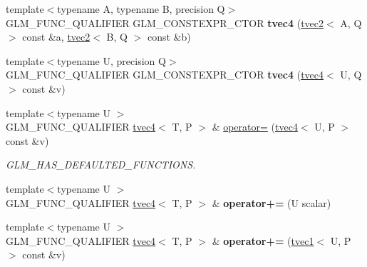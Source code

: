 \begin{DoxyCompactItemize}
\item 
\mbox{\label{structglm_1_1tvec4_acbcc1f7e126da183f0d84b52f36416b5}} 
{\footnotesize template$<$typename A, typename B, precision Q$>$ }\\G\+L\+M\+\_\+\+F\+U\+N\+C\+\_\+\+Q\+U\+A\+L\+I\+F\+I\+ER G\+L\+M\+\_\+\+C\+O\+N\+S\+T\+E\+X\+P\+R\+\_\+\+C\+T\+OR {\bfseries tvec4} (\hyperlink{structglm_1_1tvec2}{tvec2}$<$ A, Q $>$ const \&a, \hyperlink{structglm_1_1tvec2}{tvec2}$<$ B, Q $>$ const \&b)
\item 
\mbox{\label{structglm_1_1tvec4_a5fe1b0462052b13c3f0311c273d656e5}} 
{\footnotesize template$<$typename U, precision Q$>$ }\\G\+L\+M\+\_\+\+F\+U\+N\+C\+\_\+\+Q\+U\+A\+L\+I\+F\+I\+ER G\+L\+M\+\_\+\+C\+O\+N\+S\+T\+E\+X\+P\+R\+\_\+\+C\+T\+OR {\bfseries tvec4} (\hyperlink{structglm_1_1tvec4}{tvec4}$<$ U, Q $>$ const \&v)
\item 
\mbox{\label{structglm_1_1tvec4_a15eaeb5a1792f67622780d7c011b3dc4}} 
{\footnotesize template$<$typename U $>$ }\\G\+L\+M\+\_\+\+F\+U\+N\+C\+\_\+\+Q\+U\+A\+L\+I\+F\+I\+ER \hyperlink{structglm_1_1tvec4}{tvec4}$<$ T, P $>$ \& \hyperlink{structglm_1_1tvec4_a15eaeb5a1792f67622780d7c011b3dc4}{operator=} (\hyperlink{structglm_1_1tvec4}{tvec4}$<$ U, P $>$ const \&v)
\begin{DoxyCompactList}\small\item\em G\+L\+M\+\_\+\+H\+A\+S\+\_\+\+D\+E\+F\+A\+U\+L\+T\+E\+D\+\_\+\+F\+U\+N\+C\+T\+I\+O\+NS. \end{DoxyCompactList}\item 
\mbox{\label{structglm_1_1tvec4_ab912e863aaeed2404176cd748aa42b67}} 
{\footnotesize template$<$typename U $>$ }\\G\+L\+M\+\_\+\+F\+U\+N\+C\+\_\+\+Q\+U\+A\+L\+I\+F\+I\+ER \hyperlink{structglm_1_1tvec4}{tvec4}$<$ T, P $>$ \& {\bfseries operator+=} (U scalar)
\item 
\mbox{\label{structglm_1_1tvec4_ac96caa0894b30459db5b4878c145977f}} 
{\footnotesize template$<$typename U $>$ }\\G\+L\+M\+\_\+\+F\+U\+N\+C\+\_\+\+Q\+U\+A\+L\+I\+F\+I\+ER \hyperlink{structglm_1_1tvec4}{tvec4}$<$ T, P $>$ \& {\bfseries operator+=} (\hyperlink{structglm_1_1tvec1}{tvec1}$<$ U, P $>$ const \&v)

\end{DoxyCompactItemize}
